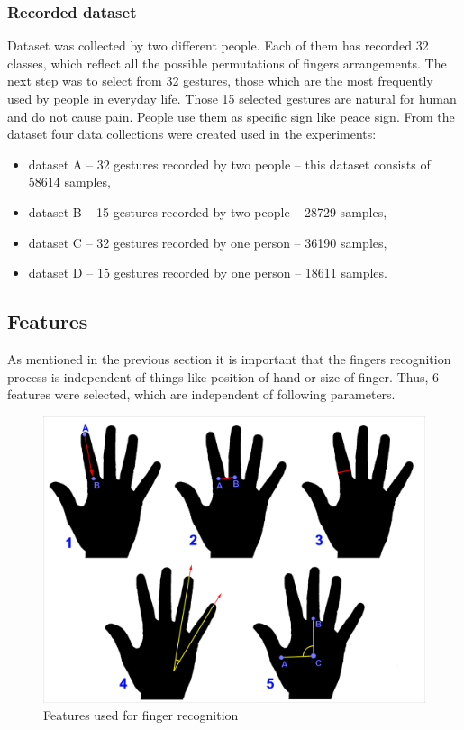 \subsubsection{Recorded dataset}
Dataset was collected by two different people. Each of them has recorded 32 classes, which reflect all the possible permutations of fingers arrangements. The next step was to select from 32 gestures, those which are the most frequently used by people in everyday life. Those 15 selected gestures are natural for human and do not cause pain. People use them as specific sign like peace sign. From the dataset four data collections were created used in the experiments:
\begin{itemize}
\item dataset A -- 32 gestures recorded by two people -- this dataset consists of 58614 samples,
\item dataset B -- 15 gestures recorded by two people -- 28729 samples,
\item dataset C -- 32 gestures recorded by one person -- 36190 samples,
\item dataset D -- 15 gestures recorded by one person -- 18611 samples.
\end{itemize}

\subsection{Features}
As mentioned in the previous section it is important that the fingers recognition process is independent of things like position of hand or size of finger. Thus, 6 features were selected, which are independent of following parameters. 

\begin{figure}[htb]
\centering
 \includegraphics[width=0.75\columnwidth]{figures/fingDiffFeatures.png}
 \caption{Features used for finger recognition}
 \label{fingfifffeatures}
\end{figure}

